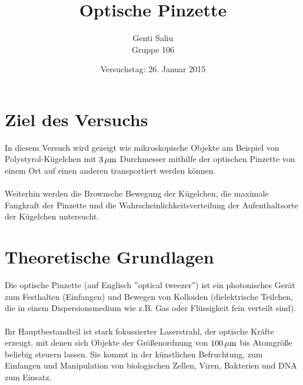 \documentclass[a4paper,titlepage]{scrartcl}
\title{Optische Pinzette}
\author{Genti Saliu\\Gruppe 106}
\date{Versuchstag: 26. Januar 2015}
\numberwithin{equation}{section}
\begin{document}
	\begin{titlepage}
		\maketitle
		\thispagestyle{empty}
	\end{titlepage}
	
\newpage
{}
\tableofcontents

\newpage
{}

\section{Ziel des Versuchs}
In diesem Versuch wird gezeigt wie mikroskopische Objekte am Beispiel von Polystyrol-Kügelchen mit $\unit[3]{\mu m}$ Durchmesser mithilfe der optischen Pinzette von einem Ort auf einen anderen transportiert werden können.\\ \\
Weiterhin werden die Brownsche Bewegung der Kügelchen, die maximale Fangkraft der Pinzette und die Wahrscheinlichkeitsverteilung der Aufenthaltsorte der Kügelchen untersucht.
\section{Theoretische Grundlagen}
Die optische Pinzette (auf Englisch ''optical tweezer'') ist ein photonisches Gerät zum Festhalten (Einfangen) und Bewegen von Kolloiden (dielektrische Teilchen, die in einem Dispersionsmedium wie z.B. Gas oder Flüssigkeit fein verteilt sind). \cite{wiki:optischepinzette}\\ \\
Ihr Hauptbestandteil ist stark fokussierter Laserstrahl, der optische Kräfte erzeugt, mit denen sich Objekte der Größenordnung von $\unit[100]{\mu m}$ bis Atomgröße beliebig steuern lassen. Sie kommt in der künstlichen Befruchtung, zum Einfangen und Manipulation von biologischen Zellen, Viren, Bakterien und DNA zum Einsatz.
\end{document}
